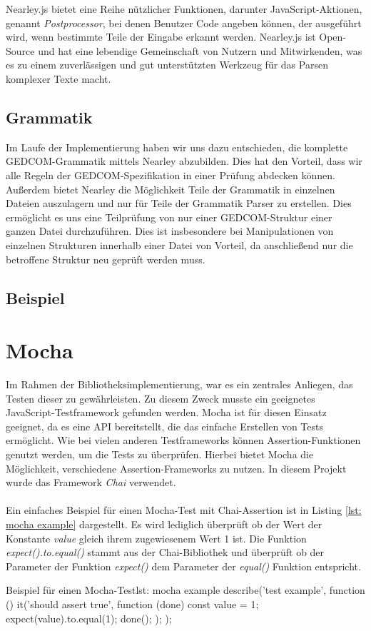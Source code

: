 Nearley.js bietet eine Reihe nützlicher Funktionen, darunter JavaScript-Aktionen, genannt \textit{Postprocessor}, bei denen Benutzer Code angeben können, 
der ausgeführt wird, wenn bestimmte Teile der Eingabe erkannt werden. Nearley.js ist Open-Source und hat eine lebendige Gemeinschaft von Nutzern und 
Mitwirkenden, was es zu einem zuverlässigen und gut unterstützten Werkzeug für das Parsen komplexer Texte macht.

\subsection*{Grammatik}
Im Laufe der Implementierung haben wir uns dazu entschieden, die komplette GEDCOM-Grammatik mittels Nearley abzubilden. Dies hat den Vorteil, dass wir 
alle Regeln der GEDCOM-Spezifikation in einer Prüfung abdecken können. Außerdem bietet Nearley die Möglichkeit Teile der Grammatik in einzelnen Dateien
auszulagern und nur für Teile der Grammatik Parser zu erstellen. Dies ermöglicht es uns eine Teilprüfung von nur einer GEDCOM-Struktur einer
ganzen Datei durchzuführen. Dies ist insbesondere bei Manipulationen von einzelnen Strukturen innerhalb einer Datei von Vorteil, da anschließend
nur die betroffene Struktur neu geprüft werden muss.

\subsection*{Beispiel}


\section{Mocha}
\label{sec: Mocha}

Im Rahmen der Bibliotheksimplementierung, war es ein zentrales Anliegen, das Testen dieser zu gewährleisten.
Zu diesem Zweck musste ein geeignetes JavaScript-Testframework gefunden werden. Mocha ist für diesen Einsatz geeignet, da es eine API bereitstellt, 
die das einfache Erstellen von Tests ermöglicht. Wie bei vielen anderen Testframeworks können Assertion-Funktionen genutzt werden, um die Tests zu überprüfen. 
Hierbei bietet Mocha die Möglichkeit, verschiedene Assertion-Frameworks zu nutzen. In diesem Projekt wurde das Framework \textit{Chai} verwendet.
\\\\
Ein einfaches Beispiel für einen Mocha-Test mit Chai-Assertion ist in Listing \ref{lst: mocha example} dargestellt. Es wird lediglich überprüft ob der Wert der Konstante
\textit{value} gleich ihrem zugewiesenem Wert 1 ist.
Die Funktion \textit{expect().to.equal()} stammt aus der Chai-Bibliothek und überprüft ob der Parameter der Funktion \textit{expect()} dem Parameter der \textit{equal()} Funktion entspricht.


\begin{javascript}{Beispiel für einen Mocha-Test}{lst: mocha example}
	describe('test example', function () {
		it('should assert true', function (done) {
			const value = 1;
			expect(value).to.equal(1);
			done();
		});
	});
\end{javascript}